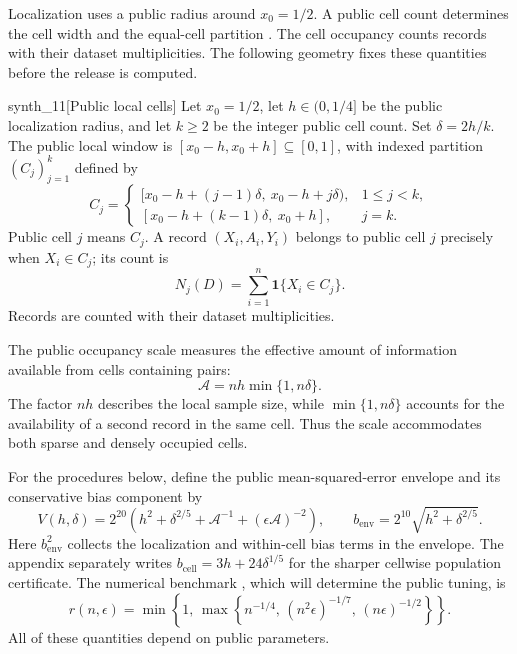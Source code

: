 \documentclass[11pt]{article}
\begin{document}
Localization uses a public radius  around \(x_0=1/2\). A public cell count  determines the cell width  and the equal-cell partition . The cell occupancy  counts records with their dataset multiplicities. The following geometry fixes these quantities before the release is computed.
\begin{definitionv}{synth_11}[Public local cells]
Let \(x_0=1/2\), let \(h\in(0,1/4]\) be the public localization radius, and let \(k\ge2\) be the integer public cell count. Set \(\delta=2h/k\). The public local window is \([x_0-h,x_0+h]\subseteq[0,1]\), with indexed partition \((C_j)_{j=1}^k\) defined by
\[
C_j=
\begin{cases}
[x_0-h+(j-1)\delta,\ x_0-h+j\delta),&1\le j<k,\\
[x_0-h+(k-1)\delta,\ x_0+h],&j=k.
\end{cases}
\]
Public cell \(j\) means \(C_j\). A record \((X_i,A_i,Y_i)\) belongs to public cell \(j\) precisely when \(X_i\in C_j\); its count is
\[
N_j(D)=\sum_{i=1}^n\mathbf1\{X_i\in C_j\}.
\]
Records are counted with their dataset multiplicities.
\end{definitionv}

The public occupancy scale  measures the effective amount of information available from cells containing pairs:
\[
\mathcal A=nh\min\{1,n\delta\}.
\]
The factor \(nh\) describes the local sample size, while \(\min\{1,n\delta\}\) accounts for the availability of a second record in the same cell. Thus the scale accommodates both sparse and densely occupied cells.

For the procedures below, define the public mean-squared-error envelope  and its conservative bias component  by
\[
V(h,\delta)=2^{20}\left(
h^2+\delta^{2/5}+\mathcal A^{-1}+(\epsilon\mathcal A)^{-2}
\right),
\qquad
b_{\mathrm{env}}=2^{10}\sqrt{h^2+\delta^{2/5}}.
\]
Here \(b_{\mathrm{env}}^2\) collects the localization and within-cell bias terms in the envelope. The appendix separately writes \(b_{\mathrm{cell}}=3h+24\delta^{1/5}\) for the sharper cellwise population certificate. The numerical benchmark , which will determine the public tuning, is
\[
r(n,\epsilon)=
\min\left\{1,\,
\max\left\{
n^{-1/4},\,
(n^2\epsilon)^{-1/7},\,
(n\epsilon)^{-1/2}
\right\}\right\}.
\]
All of these quantities depend on public parameters.
\end{document}
